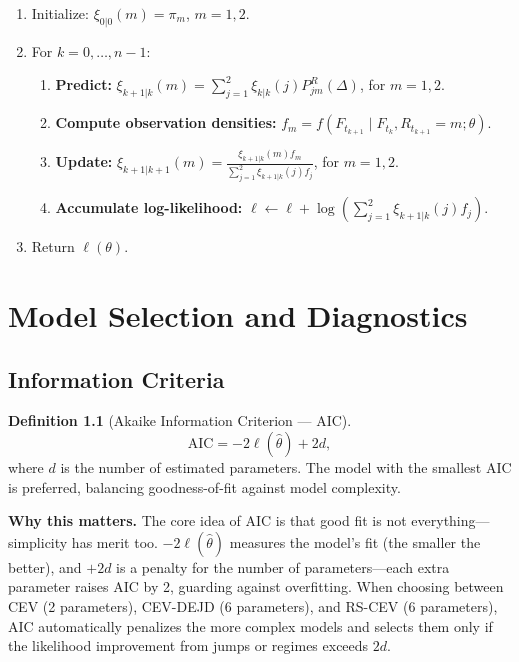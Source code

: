 \documentclass[11pt,a4paper,openany]{book}
\theoremstyle{definition}
\newtheorem{definition}{Definition}[chapter]
\theoremstyle{plain}
\theoremstyle{remark}
\newcommand{\1}{\mathbbm{1}}
\begin{document}
\begin{algorithm}
\caption{Hamilton Filter for RS-CEV}
\begin{enumerate}[label=(\arabic*)]
    \item Initialize: $\xi_{0|0}(m) = \pi_{m}$, $m = 1, 2$.
    \item For $k = 0, \ldots, n-1$:
    \begin{enumerate}
        \item \textbf{Predict:} $\xi_{k+1|k}(m) = \sum_{j=1}^{2} \xi_{k|k}(j) P_{jm}^{R}(\Delta)$, for $m = 1, 2$.
        \item \textbf{Compute observation densities:} $f_{m} = f(F_{t_{k+1}} \mid F_{t_{k}}, R_{t_{k+1}} = m; \theta)$.
        \item \textbf{Update:} $\xi_{k+1|k+1}(m) = \frac{\xi_{k+1|k}(m) f_{m}}{\sum_{j=1}^{2} \xi_{k+1|k}(j) f_{j}}$, for $m = 1, 2$.
        \item \textbf{Accumulate log-likelihood:} $\ell \leftarrow \ell + \log(\sum_{j=1}^{2} \xi_{k+1|k}(j) f_{j})$.
    \end{enumerate}
    \item Return $\ell(\theta)$.
\end{enumerate}
\end{algorithm}

\chapter{Model Selection and Diagnostics}

\section{Information Criteria}

\begin{definition}[Akaike Information Criterion --- AIC]
\[
\text{AIC} = -2 \ell(\hat{\theta}) + 2d,
\]
where $d$ is the number of estimated parameters. The model with the smallest AIC is preferred, balancing goodness-of-fit against model complexity.
\end{definition}

\medskip
\noindent\textbf{Why this matters.} The core idea of AIC is that good fit is not everything---simplicity has merit too. $-2\ell(\hat{\theta})$ measures the model's fit (the smaller the better), and $+2d$ is a penalty for the number of parameters---each extra parameter raises AIC by 2, guarding against overfitting. When choosing between CEV (2 parameters), CEV-DEJD (6 parameters), and RS-CEV (6 parameters), AIC automatically penalizes the more complex models and selects them only if the likelihood improvement from jumps or regimes exceeds $2d$.
\end{document}
